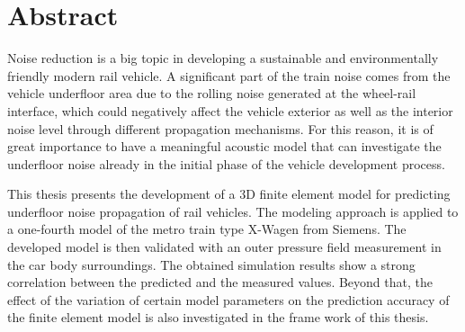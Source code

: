 \section*{Abstract}

Noise reduction is a big topic in developing a sustainable and environmentally friendly modern rail vehicle. A significant part of the train noise comes from the vehicle underfloor area due to the rolling noise generated at the wheel-rail interface, which could negatively affect the vehicle exterior as well as the interior noise level through different propagation mechanisms. For this reason, it is of great importance to have a meaningful acoustic model that can investigate the underfloor noise already in the initial phase of the vehicle development process.

This thesis presents the development of a 3D finite element model for predicting underfloor noise propagation of rail vehicles. The modeling approach is applied to a one-fourth model of the metro train type X-Wagen from Siemens. The developed model is then validated with an outer pressure field measurement in the car body surroundings. The obtained simulation results show a strong correlation between the predicted and the measured values. Beyond that, the effect of the variation of certain model parameters on the prediction accuracy of the finite element model is also investigated in the frame work of this thesis.